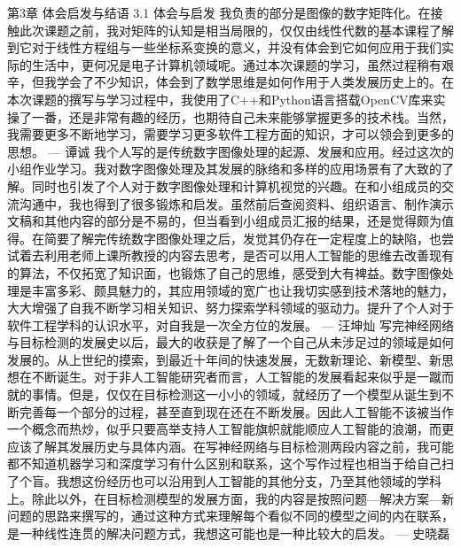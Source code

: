 第3章  体会启发与结语
3.1 体会与启发
	我负责的部分是图像的数字矩阵化。在接触此次课题之前，我对矩阵的认知是相当局限的，仅仅由线性代数的基本课程了解到它对于线性方程组与一些坐标系变换的意义，并没有体会到它如何应用于我们实际的生活中，更何况是电子计算机领域呢。通过本次课题的学习，虽然过程稍有艰辛，但我学会了不少知识，体会到了数学思维是如何作用于人类发展历史上的。在本次课题的撰写与学习过程中，我使用了C++和Python语言搭载OpenCV库来实操了一番，还是非常有趣的经历，也期待自己未来能够掌握更多的技术栈。当然，我需要更多不断地学习，需要学习更多软件工程方面的知识，才可以领会到更多的思想。
--- 谭诚
	我个人写的是传统数字图像处理的起源、发展和应用。经过这次的小组作业学习。我对数字图像处理及其发展的脉络和多样的应用场景有了大致的了解。同时也引发了个人对于数字图像处理和计算机视觉的兴趣。在和小组成员的交流沟通中，我也得到了很多锻炼和启发。虽然前后查阅资料、组织语言、制作演示文稿和其他内容的部分是不易的，但当看到小组成员汇报的结果，还是觉得颇为值得。在简要了解完传统数字图像处理之后，发觉其仍存在一定程度上的缺陷，也尝试着去利用老师上课所教授的内容去思考，是否可以用人工智能的思维去改善现有的算法，不仅拓宽了知识面，也锻炼了自己的思维，感受到大有裨益。数字图像处理是丰富多彩、颇具魅力的，其应用领域的宽广也让我切实感到技术落地的魅力，大大增强了自我不断学习相关知识、努力探索学科领域的驱动力。提升了个人对于软件工程学科的认识水平，对自我是一次全方位的发展。
--- 汪坤灿
写完神经网络与目标检测的发展史以后，最大的收获是了解了一个自己从未涉足过的领域是如何发展的。从上世纪的摸索，到最近十年间的快速发展，无数新理论、新模型、新思想在不断诞生。对于非人工智能研究者而言，人工智能的发展看起来似乎是一蹴而就的事情。但是，仅仅在目标检测这一小小的领域，就经历了一个模型从诞生到不断完善每一个部分的过程，甚至直到现在还在不断发展。因此人工智能不该被当作一个概念而热炒，似乎只要高举支持人工智能旗帜就能顺应人工智能的浪潮，而更应该了解其发展历史与具体内涵。在写神经网络与目标检测两段内容之前，我可能都不知道机器学习和深度学习有什么区别和联系，这个写作过程也相当于给自己扫了个盲。我想这份经历也可以沿用到人工智能的其他分支，乃至其他领域的学科上。除此以外，在目标检测模型的发展方面，我的内容是按照问题---解决方案---新问题的思路来撰写的，通过这种方式来理解每个看似不同的模型之间的内在联系，是一种线性连贯的解决问题方式，我想这可能也是一种比较大的启发。
--- 史晓磊

